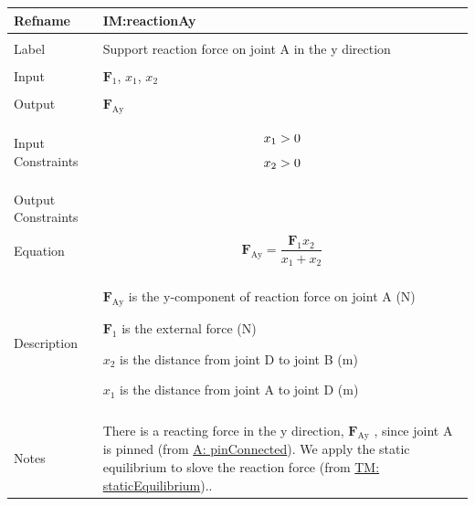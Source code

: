 \documentclass[12pt]{article}
\newcommand{\gt}{\ensuremath >}
\begin{document}
\vspace{\baselineskip}
\noindent
\begin{minipage}{\textwidth}
\begin{tabular}{>{\raggedright}p{}>{\raggedright\arraybackslash}p{}}
\toprule \textbf{Refname} & \textbf{IM:reactionAy}
\label{IM:reactionAy}
\\ \midrule \\
Label & Support reaction force on joint A in the y direction
        
\\ \midrule \\
Input & ${\mathbf{F}_{1}}$, ${x_{\text{1}}}$, ${x_{\text{2}}}$
        
\\ \midrule \\
Output & ${\mathbf{F}_{\text{Ay}}}$
         
\\ \midrule \\
Input Constraints & \begin{displaymath}
                    {x_{\text{1}}}\gt{}0
                    \end{displaymath}
                    \begin{displaymath}
                    {x_{\text{2}}}\gt{}0
                    \end{displaymath}
\\ \midrule \\
Output Constraints & 
\\ \midrule \\
Equation & \begin{displaymath}
           {\mathbf{F}_{\text{Ay}}}=\frac{{\mathbf{F}_{1}} {x_{\text{2}}}}{{x_{\text{1}}}+{x_{\text{2}}}}
           \end{displaymath}
\\ \midrule \\
Description & \begin{symbDescription}
              \item{${\mathbf{F}_{\text{Ay}}}$ is the y-component of reaction force on joint A (${\text{N}}$)}
              \item{${\mathbf{F}_{1}}$ is the external force (${\text{N}}$)}
              \item{${x_{\text{2}}}$ is the distance from joint D to joint B (${\text{m}}$)}
              \item{${x_{\text{1}}}$ is the distance from joint A to joint D (${\text{m}}$)}
              \end{symbDescription}
\\ \midrule \\
Notes & There is a reacting force in the y direction, ${\mathbf{F}_{\text{Ay}}}$ , since joint A is pinned (from \hyperref[pinConnected]{A: pinConnected}). We apply the static equilibrium to slove the reaction force (from \hyperref[TM:staticEquilibrium]{TM: staticEquilibrium})..
        

\end{tabular}
\end{minipage}
\end{document}
